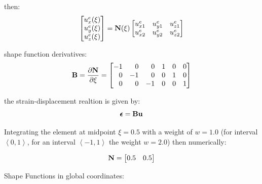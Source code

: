then:
\begin{equation}
    \begin{bmatrix}
        u_x^e(\xi) \\
        u_y^e(\xi) \\
        u_z^e(\xi) \\
    \end{bmatrix}
    = \mathbf{N}(\xi) \begin{bmatrix}
        u_{x1}^e & u_{y1}^e& u_{z1}^e \\
        u_{x2}^e & u_{y2}^e& u_{z2}^e \\
    \end{bmatrix}
\end{equation}

shape function derivatives:
\begin{equation}
    \mathbf{B} = \frac{\partial \mathbf{N}}{\partial \xi} =
    \begin{bmatrix}
        -1 & \phantom{-}0 & \phantom{-}0 & 1 & 0 & 0 \\
        \phantom{-}0 & -1 & \phantom{-}0 & 0 & 1 & 0  \\
        \phantom{-}0 & \phantom{-}0 & -1 & 0 & 0 & 1  \\
    \end{bmatrix}
\end{equation}

the strain-displacement realtion is given by:
\begin{equation}
    \pmb{\epsilon} = \mathbf{B} \mathbf{u}
\end{equation}

Integrating the element at midpoint $ \xi = 0.5 $ with a weight of $ w = 1.0 $
(for interval $ \left< 0, 1 \right> $, for an interval
$ \left< -1,  1 \right> $ the weight $ w = 2.0 $)
then numerically:

\begin{equation}
    \mathbf{N} = \begin{bmatrix}
        0.5 & 0.5 \\
    \end{bmatrix}
\end{equation}

Shape Functions in global coordinates:

